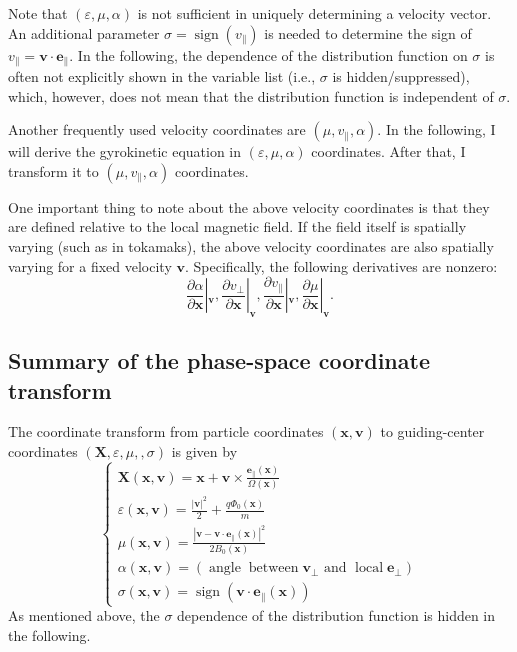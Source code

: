 \documentclass{llncs}
\newcommand{\infixand}{\text{ and }}
\newcommand{\nobracket}{}
\newcommand{\tmmathbf}[1]{\ensuremath{\boldsymbol{#1}}}
\newcommand{\tmop}[1]{\ensuremath{\operatorname{#1}}}
\begin{document}
Note that $(\varepsilon, \mu, \alpha)$ is not sufficient in uniquely
determining a velocity vector. An additional parameter $\sigma = \tmop{sign}
(v_{\parallel})$ is needed to determine the sign of $v_{\parallel} =\mathbf{v}
\cdot \mathbf{e}_{\parallel}$. In the following, the dependence of the
distribution function on $\sigma$ is often not explicitly shown in the
variable list (i.e., $\sigma$ is hidden/suppressed), which, however, does not
mean that the distribution function is independent of $\sigma$.

Another frequently used velocity coordinates are $(\mu, v_{\parallel},
\alpha)$. In the following, I will derive the gyrokinetic equation in
$(\varepsilon, \mu, \alpha)$ coordinates. After that, I transform it to $(\mu,
v_{\parallel}, \alpha)$ coordinates.

One important thing to note about the above velocity coordinates is that they
are defined relative to the local magnetic field. If the field itself is
spatially varying (such as in tokamaks), the above velocity coordinates are
also spatially varying for a fixed velocity $\mathbf{v}$. Specifically, the
following derivatives are nonzero:
\begin{equation}
  \frac{\partial \alpha}{\partial \mathbf{x}} |_{\mathbf{v}} \nobracket,
  \frac{\partial v_{\perp}}{\partial \mathbf{x}} |_{\mathbf{v}} \nobracket,
  \frac{\partial v_{\parallel}}{\partial \mathbf{x}} |_{\mathbf{v}}
  \nobracket, \frac{\partial \mu}{\partial \mathbf{x}} |_{\mathbf{v}}
  \nobracket .
\end{equation}

\subsection{Summary of the phase-space coordinate transform}

The coordinate transform from particle coordinates $(\mathbf{x}, \mathbf{v})$
to guiding-center coordinates $(\mathbf{X}, \varepsilon, \mu,, \sigma)$ is
given by
\begin{equation}
  \label{21-8-25-a1} \left\{\begin{array}{l}
    \mathbf{X} (\mathbf{x}, \mathbf{v}) =\mathbf{x}+\mathbf{v} \times
    \frac{\tmmathbf{e}_{\parallel} (\mathbf{x})}{\Omega (\mathbf{x})}\\
    \varepsilon (\mathbf{x}, \mathbf{v}) = \frac{| \mathbf{v} |^2}{2} +
    \frac{q \Phi_0 (\mathbf{x})}{m}\\
    \mu (\mathbf{x}, \mathbf{v}) = \frac{| \mathbf{v}-\mathbf{v} \cdot
    \mathbf{e}_{\parallel} (\mathbf{x}) |^2}{2 B_0 (\mathbf{x})}\\
    \alpha (\mathbf{x}, \mathbf{v}) = \left( \tmop{angle} \tmop{between}
    \mathbf{v}_{\perp} \infixand \tmop{local} \mathbf{e}_{\perp} \right)\\
    \sigma (\mathbf{x}, \mathbf{v}) = \tmop{sign} (\mathbf{v} \cdot
    \mathbf{e}_{\parallel} (\mathbf{x}))
  \end{array}\right.
\end{equation}
As mentioned above, the $\sigma$ dependence of the distribution function is
hidden in the following.
\end{document}
